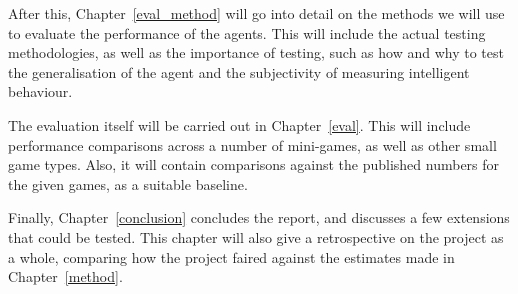 After this, Chapter~\ref{eval_method} will go into detail on the methods we will use
to evaluate the performance of the agents. This will include the actual testing
methodologies, as well as the importance of testing, such as how and why
to test the generalisation of the agent and the subjectivity of measuring
intelligent behaviour.

The evaluation itself will be carried out in Chapter~\ref{eval}.
This will include performance
comparisons across a number of mini-games, as well as other small game types.
Also, it will contain comparisons against the published numbers for the given
games, as a suitable baseline.

Finally, Chapter~\ref{conclusion} concludes the report, and discusses a few
extensions that could be tested. This chapter will also give a retrospective
on the project as a whole, comparing how the project faired against the estimates
made in Chapter~\ref{method}.

